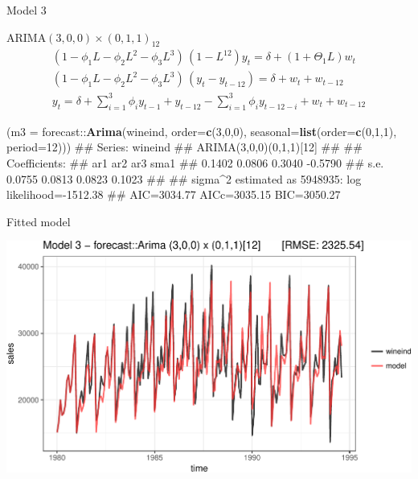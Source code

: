 \documentclass[11pt,ignorenonframetext,]{beamer}
\newenvironment{Shaded}{}{}
\newcommand{\DataTypeTok}[1]{\textcolor[rgb]{0.56,0.13,0.00}{#1}}
\newcommand{\DecValTok}[1]{\textcolor[rgb]{0.25,0.63,0.44}{#1}}
\newcommand{\KeywordTok}[1]{\textcolor[rgb]{0.00,0.44,0.13}{\textbf{#1}}}
\newcommand{\NormalTok}[1]{#1}
\newcommand{\OperatorTok}[1]{\textcolor[rgb]{0.40,0.40,0.40}{#1}}
\let\oldShaded\Shaded
\let\endoldShaded\endShaded
\renewenvironment{Shaded}{\footnotesize\begin{spacing}{0.9}\oldShaded}{\endoldShaded\end{spacing}}
\begin{document}
\begin{frame}[fragile]{%
\protect\hypertarget{model-3}{%
Model 3}}

\(\text{ARIMA}(3,0,0) \times (0,1,1)_{12}\) \[
\begin{aligned}
(1-\phi_1 L - \phi_2 L^2 - \phi_3 L^3) \, (1-L^{12}) y_t = \delta + (1 + \Theta_1 L)w_t \\
(1-\phi_1 L - \phi_2 L^2 - \phi_3 L^3) \, (y_t-y_{t-12}) = \delta + w_t + w_{t-12} \\
y_t = \delta + \sum_{i=1}^3 \phi_i y_{t-1}  + y_{t-12}  - \sum_{i=1}^3 \phi_i y_{t-12-i} + w_t + w_{t-12}
\end{aligned}
\]

\begin{Shaded}
\begin{Highlighting}[]
\NormalTok{(}\DataTypeTok{m3 =}\NormalTok{ forecast}\OperatorTok{::}\KeywordTok{Arima}\NormalTok{(wineind, }\DataTypeTok{order=}\KeywordTok{c}\NormalTok{(}\DecValTok{3}\NormalTok{,}\DecValTok{0}\NormalTok{,}\DecValTok{0}\NormalTok{), }
                      \DataTypeTok{seasonal=}\KeywordTok{list}\NormalTok{(}\DataTypeTok{order=}\KeywordTok{c}\NormalTok{(}\DecValTok{0}\NormalTok{,}\DecValTok{1}\NormalTok{,}\DecValTok{1}\NormalTok{), }\DataTypeTok{period=}\DecValTok{12}\NormalTok{)))}
\NormalTok{## Series: wineind }
\NormalTok{## ARIMA(3,0,0)(0,1,1)[12] }
\NormalTok{## }
\NormalTok{## Coefficients:}
\NormalTok{##          ar1     ar2     ar3     sma1}
\NormalTok{##       0.1402  0.0806  0.3040  -0.5790}
\NormalTok{## s.e.  0.0755  0.0813  0.0823   0.1023}
\NormalTok{## }
\NormalTok{## sigma^2 estimated as 5948935:  log likelihood=-1512.38}
\NormalTok{## AIC=3034.77   AICc=3035.15   BIC=3050.27}
\end{Highlighting}
\end{Shaded}

\end{frame}

\begin{frame}{%
\protect\hypertarget{fitted-model-3}{%
Fitted model}}

\begin{center}\includegraphics[width=\textwidth]{Lec11_files/figure-beamer/unnamed-chunk-13-1} \end{center}

\end{frame}
\end{document}
